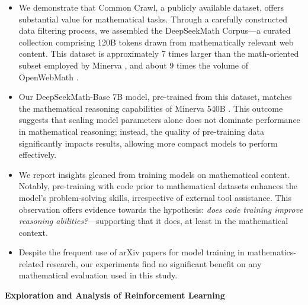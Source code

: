 \begin{itemize}[topsep=0pt]
    \item We demonstrate that Common Crawl, a publicly available dataset, offers substantial value for mathematical tasks. Through a carefully constructed data filtering process, we assembled the DeepSeekMath Corpus—a curated collection comprising 120B tokens drawn from mathematically relevant web content. This dataset is approximately 7 times larger than the math-oriented subset employed by Minerva \citep{minerva}, and about 9 times the volume of OpenWebMath \citep{openwebmath}.

    \item Our DeepSeekMath-Base 7B model, pre-trained from this dataset, matches the mathematical reasoning capabilities of Minerva 540B \citep{minerva}. This outcome suggests that scaling model parameters alone does not dominate performance in mathematical reasoning; instead, the quality of pre-training data significantly impacts results, allowing more compact models to perform effectively.

    \item We report insights gleaned from training models on mathematical content. Notably, pre-training with code prior to mathematical datasets enhances the model’s problem-solving skills, irrespective of external tool assistance. This observation offers evidence towards the hypothesis: \textit{does code training improve reasoning abilities?}—supporting that it does, at least in the mathematical context.

    \item Despite the frequent use of arXiv papers for model training in mathematics-related research, our experiments find no significant benefit on any mathematical evaluation used in this study.
\end{itemize}

\textbf{Exploration and Analysis of Reinforcement Learning}


